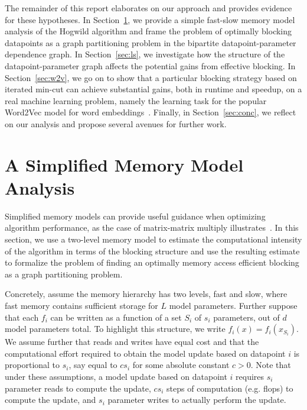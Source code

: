 \documentclass[times,11pt]{article}
\numberwithin{equation}{section}		%
\numberwithin{figure}{section}			%
\numberwithin{table}{section}				%
\begin{document}
The remainder of this report elaborates on our approach and provides evidence for these hypotheses. In Section~\ref{sec:memory-model}, we provide a simple fast-slow memory model analysis of the Hogwild algorithm and frame the problem of optimally blocking datapoints as a 
graph partitioning problem in the bipartite datapoint-parameter dependence graph. In Section~\ref{sec:ls}, we investigate how the structure of the datapoint-parameter graph affects the potential gains from effective blocking. In Section~\ref{sec:w2v}, we go on to show that a particular blocking strategy
based on iterated min-cut can achieve substantial gains, both in runtime and speedup, on a real machine learning problem, namely the learning task for the popular Word2Vec model for word embeddings~\citep{}. Finally, in Section~\ref{sec:conc}, we reflect on our analysis and propose several avenues
for further work.

\section{A Simplified Memory Model Analysis}\label{sec:memory-model}

Simplified memory models can provide useful guidance when optimizing algorithm performance, as the case of matrix-matrix multiply illustrates~\citep{}. In this section, we use a two-level memory model to estimate the computational intensity of the algorithm
in terms of the blocking structure and use the resulting estimate to formalize the problem of finding an optimally memory access efficient blocking as a graph partitioning problem.

Concretely, assume the memory hierarchy has two levels, fast and slow, where fast memory contains sufficient storage for $L$ model parameters. Further suppose that each $f_{i}$ can be written as a function of a set $S_{i}$ of $s_{i}$ parameters, out of $d$ model parameters total. To highlight this structure, we write 
$f_{i}\left(x\right) = f_{i}\left(x_{S_i}\right)$. We assume further that reads and writes have equal cost and that the computational effort required to obtain the model update based on datapoint $i$ is proportional to $s_{i}$, say equal to $cs_{i}$ for some absolute constant $c > 0$. Note that under these assumptions, a model update based on datapoint $i$ requires $s_{i}$ parameter reads to compute the update, $cs_{i}$ steps of computation (e.g. flops) to compute the update, and $s_{i}$ parameter writes to actually perform the update.
\end{document}
